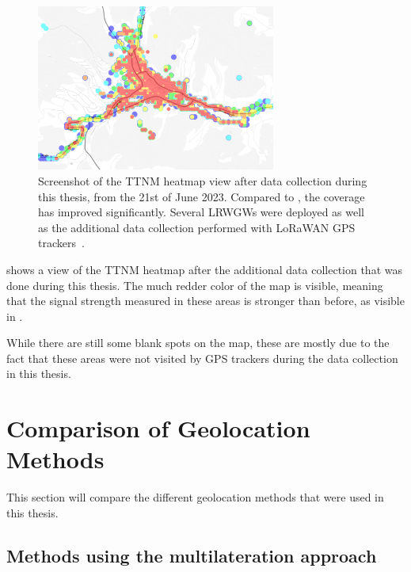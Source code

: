 \begin{figure}[htbp]
    \centering
    \includegraphics[width=0.7\textwidth]{pictures/ttn-mapper/ttnm_heatmap_after_data_collection.jpg}
    \caption[Screenshot of the \acl{TTNM} heatmap view after data collection during this thesis, from the 21st of June 2023]{
        Screenshot of the \ac{TTNM} heatmap view after data collection during this thesis, from the 21st of June 2023.
        Compared to , the coverage has improved significantly.
        Several \aclp{LRWGW} were deployed as well as the additional data collection performed with \ac{LoRaWAN} \ac{GPS} trackers~\cite{ttn_mapper_ttn_2023}.
    }\label{pic:ttnm-heatmap-after-data-collection}
\end{figure}

 shows a view of the \ac{TTNM} heatmap after the additional data collection that was done during this thesis.
The much redder color of the map is visible, meaning that the signal strength measured in these areas is stronger than before, as visible in .

While there are still some blank spots on the map, these are mostly due to the fact that these areas were not visited by \ac{GPS} trackers during the data collection in this thesis.

\section{Comparison of Geolocation Methods}

This section will compare the different geolocation methods that were used in this thesis.

\subsection{Methods using the multilateration approach}\label{subsec:conclusion-multilateration}

